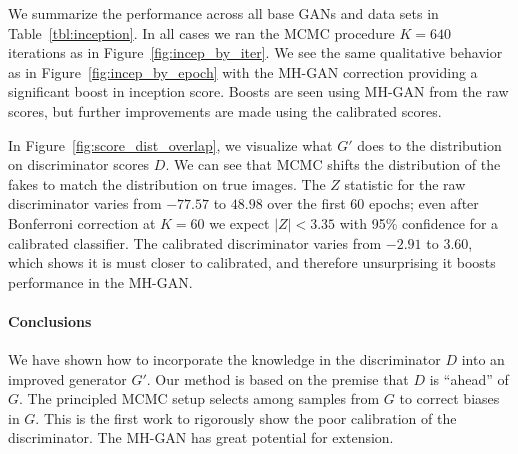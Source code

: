 \documentclass{article}
\begin{document}
We summarize the performance across all base GANs and data sets in Table~\ref{tbl:inception}.
In all cases we ran the MCMC procedure $K=640$ iterations as in Figure~\ref{fig:incep_by_iter}.
We see the same qualitative behavior as in Figure~\ref{fig:incep_by_epoch} with the MH-GAN correction providing a significant boost in inception score.
Boosts are seen using MH-GAN from the raw scores, but further improvements are made using the calibrated scores.

In Figure~\ref{fig:score_dist_overlap}, we visualize what $G'$ does to the distribution on discriminator scores $D$.
We can see that MCMC shifts the distribution of the fakes to match the distribution on true images.
The $Z$ statistic for the raw discriminator varies from $-77.57$ to $48.98$ over the first 60 epochs; even after Bonferroni correction at $K=60$ we expect $|Z| < 3.35$ with 95\% confidence for a calibrated classifier.
The calibrated discriminator varies from $-2.91$ to $3.60$, which shows it is must closer to calibrated, and therefore unsurprising it boosts performance in the MH-GAN\@.

\paragraph{Conclusions}
We have shown how to incorporate the knowledge in the discriminator $D$ into an improved generator $G'$.
Our method is based on the premise that $D$ is ``ahead'' of $G$.
The principled MCMC setup selects among samples from $G$ to correct biases in $G$.
This is the first work to rigorously show the poor calibration of the discriminator.
The MH-GAN has great potential for extension.  %


\end{document}
